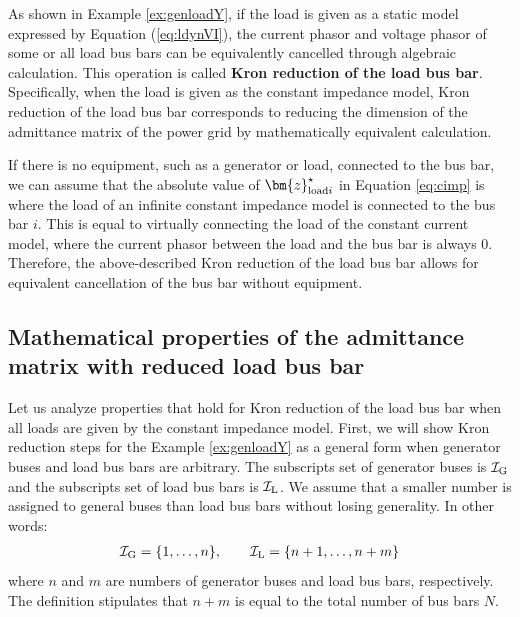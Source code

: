 \documentclass[graybox, envcountchap]{svmult}
\begin{document}
As shown in Example \ref{ex:genloadY}, if the load is given as a static model expressed by Equation (\ref{eq:ldynVI}), the current phasor and voltage phasor of some or all load bus bars can be equivalently cancelled through algebraic calculation.
This operation is called \textbf{Kron reduction of the load bus bar}.
Specifically, when the load is given as the constant impedance model, Kron reduction of the load bus bar corresponds to reducing the dimension of the admittance matrix of the power grid by mathematically equivalent calculation.

If there is no equipment, such as a generator or load, connected to the bus bar, we can assume that the absolute value of $\bm{z}_{{\rm load}i}^{\star}$ in Equation \ref{eq:cimp} is where the load of an infinite constant impedance model is connected to the bus bar $i$.
This is equal to virtually connecting the load of the constant current model, where the current phasor between the load and the bus bar is always 0.
Therefore, the above-described Kron reduction of the load bus bar allows for equivalent cancellation of the bus bar without equipment.


\subsection{Mathematical properties of the admittance matrix with reduced load bus bar}

Let us analyze properties that hold for Kron reduction of the load bus bar when all loads are given by the constant impedance model.
First, we will show Kron reduction steps for the Example \ref{ex:genloadY} as a general form when generator buses and load bus bars are arbitrary.
The subscripts set of generator buses is $\mathcal{I}_{\rm G}$ and the subscripts set of load bus bars is $\mathcal{I}_{\rm L}$.
We assume that a smaller number is assigned to general buses than load bus bars without losing generality. In other words:
\begin{align*}
\mathcal{I}_{\rm G} = \{ 1,\ldots, n \},\qquad
\mathcal{I}_{\rm L} = \{ n+1,\ldots, n + m \}
\end{align*}
where $n$ and $m$ are numbers of generator buses and load bus bars, respectively.
The definition stipulates that $n+m$ is equal to the total number of bus bars $N$.
\end{document}
